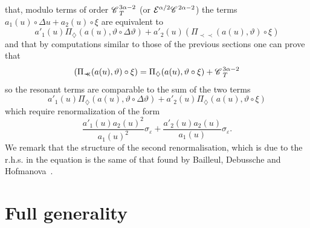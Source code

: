 \documentclass[11pt,reqno]{amsart}
\newcommand{\precprec}{\prec\!\!\!\prec}
\newcommand{\CC}{\mathscr{C} \hspace{.1em}}
\begin{document}
that, modulo terms of order $\CC^{3 \alpha - 2}_T$ (or $\mathcal{E}^{\alpha /
2} \CC^{2 \alpha - 2}$) the terms $a_1 (u) \circ \Delta u + a_2 (u) \circ \xi$
are equivalent to
\[ a'_1 (u) \Pi_{\diamondsuit} (a (u), \vartheta \circ \Delta \vartheta) +
   a'_2 (u) (\Pi_{\precprec} (a (u), \vartheta) \circ \xi) \]
and that by computations similar to those of the previous sections one can
prove that
\[ (\Pi_{\precprec} (a (u), \vartheta) \circ \xi) = \Pi_{\diamondsuit} (a (u),
   \vartheta \circ \xi) + \CC^{3 \alpha - 2}_T \]
so the resonant terms are comparable to the sum of the two terms
\[ a'_1 (u) \Pi_{\diamondsuit} (a (u), \vartheta \circ \Delta \vartheta) +
   a'_2 (u) \Pi_{\diamondsuit} (a (u), \vartheta \circ \xi) \]
which require renormalization of the form
\begin{equation}
  \frac{a'_1 (u) a_2 (u)^2}{a_1 (u)^2} \sigma_{\varepsilon} + \frac{a'_2 (u)
  a_2 (u)}{a_1 (u)} \sigma_{\varepsilon} . \label{eq:renorm-non-linear-rhs}
\end{equation}
We remark that the structure of the second renormalisation, which is due to
the r.h.s. in the equation is the same of that found by Bailleul, Debussche
and Hofmanova~{\cite{hofmanova}}.

\section{Full generality}
\end{document}
